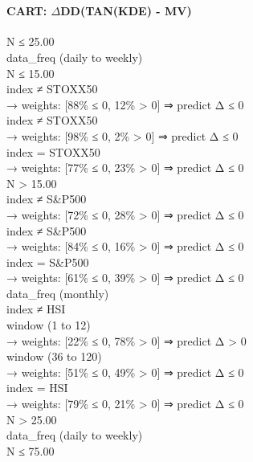 \
\paragraph{CART: $\Delta$DD(TAN(KDE) - MV)}

\begin{flushleft}
\ttfamily %
N ≤ 25.00 \\
\quad data\_freq (daily to weekly) \\
\quad \quad N ≤ 15.00 \\
\quad \quad \quad index ≠ STOXX50 \\
\quad \quad \quad \quad → weights: [88\% ≤ 0, 12\% > 0] ⇒ predict Δ ≤ 0 \\
\quad \quad \quad index ≠ STOXX50 \\
\quad \quad \quad \quad → weights: [98\% ≤ 0, 2\% > 0] ⇒ predict Δ ≤ 0 \\
\quad \quad \quad index = STOXX50 \\
\quad \quad \quad \quad → weights: [77\% ≤ 0, 23\% > 0] ⇒ predict Δ ≤ 0 \\
\quad \quad N > 15.00 \\
\quad \quad \quad index ≠ S\&P500 \\
\quad \quad \quad \quad → weights: [72\% ≤ 0, 28\% > 0] ⇒ predict Δ ≤ 0 \\
\quad \quad \quad index ≠ S\&P500 \\
\quad \quad \quad \quad → weights: [84\% ≤ 0, 16\% > 0] ⇒ predict Δ ≤ 0 \\
\quad \quad \quad index = S\&P500 \\
\quad \quad \quad \quad → weights: [61\% ≤ 0, 39\% > 0] ⇒ predict Δ ≤ 0 \\
\quad data\_freq (monthly) \\
\quad \quad index ≠ HSI \\
\quad \quad \quad window (1 to 12) \\
\quad \quad \quad \quad → weights: [22\% ≤ 0, 78\% > 0] ⇒ predict Δ > 0 \\
\quad \quad \quad window (36 to 120) \\
\quad \quad \quad \quad → weights: [51\% ≤ 0, 49\% > 0] ⇒ predict Δ ≤ 0 \\
\quad \quad index = HSI \\
\quad \quad \quad \quad → weights: [79\% ≤ 0, 21\% > 0] ⇒ predict Δ ≤ 0 \\
N > 25.00 \\
\quad data\_freq (daily to weekly) \\
\quad \quad N ≤ 75.00 \\

\end{flushleft}
